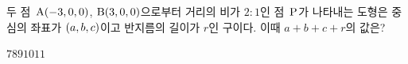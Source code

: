 두 점~$\mathrm{A}(-3{,}\mkern3mu\mathopen{}0{,}\mkern3mu\mathopen{}0)$, $\mathrm{B}(3{,}\mkern3mu\mathopen{}0{,}\mkern3mu\mathopen{}0)$으로부터 거리의 비가 $2:1$인 점~$\mathrm{P}$가 나타내는 도형은 중심의 좌표가 $(a{,}\mkern3mu\mathopen{}b{,}\mkern3mu\mathopen{}c)$이고 반지름의 길이가 $r$인 구이다. 이때 $a+b+c+r$의 값은?
\begin{choices32}{$7$}{$8$}{$9$}{$10$}{$11$}\end{choices32}

